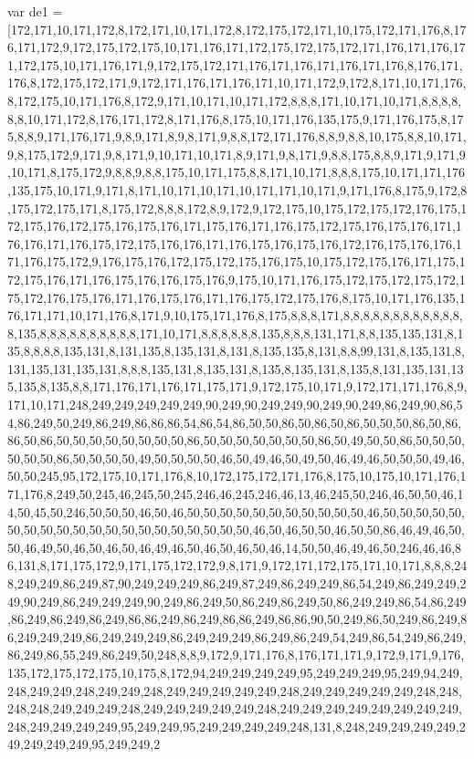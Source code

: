 var de1 = [172,171,10,171,172,8,172,171,10,171,172,8,172,175,172,171,10,175,172,171,176,8,176,171,172,9,172,175,172,175,10,171,176,171,172,175,172,175,172,171,176,171,176,171,172,175,10,171,176,171,9,172,175,172,171,176,171,176,171,176,171,176,8,176,171,176,8,172,175,172,171,9,172,171,176,171,176,171,10,171,172,9,172,8,171,10,171,176,8,172,175,10,171,176,8,172,9,171,10,171,10,171,172,8,8,8,171,10,171,10,171,8,8,8,8,8,8,10,171,172,8,176,171,172,8,171,176,8,175,10,171,176,135,175,9,171,176,175,8,175,8,8,9,171,176,171,9,8,9,171,8,9,8,171,9,8,8,172,171,176,8,8,9,8,8,10,175,8,8,10,171,9,8,175,172,9,171,9,8,171,9,10,171,10,171,8,9,171,9,8,171,9,8,8,175,8,8,9,171,9,171,9,10,171,8,175,172,9,8,8,9,8,8,175,10,171,175,8,8,171,10,171,8,8,8,175,10,171,171,176,135,175,10,171,9,171,8,171,10,171,10,171,10,171,171,10,171,9,171,176,8,175,9,172,8,175,172,175,171,8,175,172,8,8,8,172,8,9,172,9,172,175,10,175,172,175,172,176,175,172,175,176,172,175,176,175,176,171,175,176,171,176,175,172,175,176,175,176,171,176,176,171,176,175,172,175,176,176,171,176,175,176,175,176,172,176,175,176,176,171,176,175,172,9,176,175,176,172,175,172,175,176,175,10,175,172,175,176,171,175,172,175,176,171,176,175,176,176,175,176,9,175,10,171,176,175,172,175,172,175,172,175,172,176,175,176,171,176,175,176,171,176,175,172,175,176,8,175,10,171,176,135,176,171,171,10,171,176,8,171,9,10,175,171,176,8,175,8,8,8,171,8,8,8,8,8,8,8,8,8,8,8,8,8,135,8,8,8,8,8,8,8,8,8,8,171,10,171,8,8,8,8,8,8,135,8,8,8,131,171,8,8,135,135,131,8,135,8,8,8,8,135,131,8,131,135,8,135,131,8,131,8,135,135,8,131,8,8,99,131,8,135,131,8,131,135,131,135,131,8,8,8,135,131,8,135,131,8,135,8,135,131,8,135,8,131,135,131,135,135,8,135,8,8,171,176,171,176,171,175,171,9,172,175,10,171,9,172,171,171,176,8,9,171,10,171,248,249,249,249,249,249,90,249,90,249,249,90,249,90,249,86,249,90,86,54,86,249,50,249,86,249,86,86,86,54,86,54,86,50,50,86,50,86,50,86,50,50,50,86,50,86,86,50,86,50,50,50,50,50,50,50,50,86,50,50,50,50,50,50,50,86,50,49,50,50,86,50,50,50,50,50,50,86,50,50,50,50,49,50,50,50,50,46,50,49,46,50,49,50,46,49,46,50,50,50,49,46,50,50,245,95,172,175,10,171,176,8,10,172,175,172,171,176,8,175,10,175,10,171,176,171,176,8,249,50,245,46,245,50,245,246,46,245,246,46,13,46,245,50,246,46,50,50,46,14,50,45,50,246,50,50,50,46,50,46,50,50,50,50,50,50,50,50,50,50,50,46,50,50,50,50,50,50,50,50,50,50,50,50,50,50,50,50,50,50,50,50,46,50,46,50,50,46,50,50,86,46,49,46,50,50,46,49,50,46,50,46,50,46,49,46,50,46,50,46,50,46,14,50,50,46,49,46,50,246,46,46,86,131,8,171,175,172,9,171,175,172,172,9,8,171,9,172,171,172,175,171,10,171,8,8,8,248,249,249,86,249,87,90,249,249,249,86,249,87,249,86,249,249,86,54,249,86,249,249,249,90,249,86,249,249,249,90,249,86,249,50,86,249,86,249,50,86,249,249,86,54,86,249,86,249,86,249,86,249,86,86,249,86,249,86,86,249,86,86,90,50,249,86,50,249,86,249,86,249,249,249,86,249,249,249,86,249,249,249,86,249,86,249,54,249,86,54,249,86,249,86,249,86,55,249,86,249,50,248,8,8,9,172,9,171,176,8,176,171,171,9,172,9,171,9,176,135,172,175,172,175,10,175,8,172,94,249,249,249,249,95,249,249,249,95,249,94,249,248,249,249,248,249,249,248,249,249,249,249,249,248,249,249,249,249,249,248,248,248,248,249,249,249,248,249,249,249,249,249,248,249,249,249,249,249,249,249,249,248,249,249,249,249,95,249,249,95,249,249,249,249,248,131,8,248,249,249,249,249,249,249,249,249,95,249,249,2